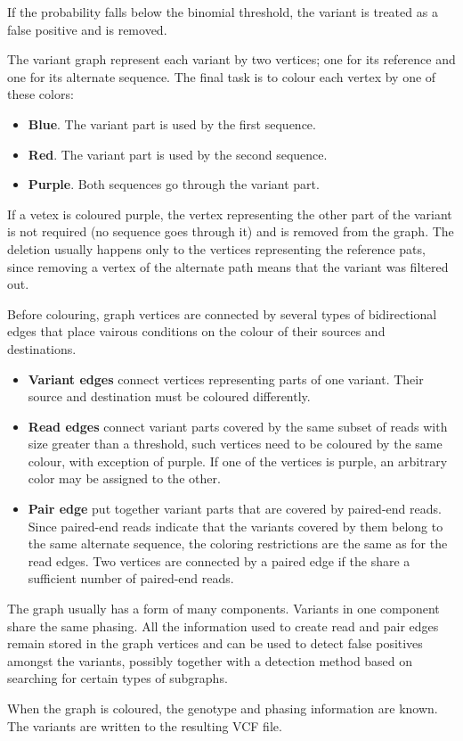 If the probability falls below the binomial threshold, the variant is treated as a false positive and is removed.

The variant graph represent each variant by two vertices; one for its reference and one for its alternate sequence. The final task is to colour each vertex by one of these colors:
\begin{itemize}
\item \textbf{Blue}. The variant part is used by the first sequence.
\item \textbf{Red}. The variant part is used by the second sequence.
\item \textbf{Purple}. Both sequences go through the variant part.
\end{itemize}

If a vetex is coloured purple, the vertex representing the other part of the variant is not required (no sequence goes through it) and is removed from the graph. The deletion usually happens only to the vertices representing the reference pats, since removing a vertex of the alternate path means that the variant was filtered out.

Before colouring, graph vertices are connected by several types of bidirectional edges that place vairous conditions on the colour of their sources and destinations.
\begin{itemize}
\item \textbf{Variant edges} connect vertices representing parts of one variant. Their source and destination must be coloured differently.
\item \textbf{Read edges} connect variant parts covered by the same subset of reads with size greater than a threshold, such vertices need to be coloured by the same colour, with exception of purple. If one of the vertices is purple, an arbitrary color may be assigned
to the other.
\item \textbf{Pair edge} put together variant parts that are covered by paired-end reads. Since paired-end reads indicate that the variants covered by them belong to the same alternate sequence, the coloring restrictions are the same as for the read edges. Two vertices are connected by a paired edge if the share a sufficient number of paired-end reads.
\end{itemize}

The graph usually has a form of many components. Variants in one component share the same phasing. All the information used to create read and pair edges remain stored in the graph vertices and can be used to detect false positives amongst the variants, possibly together with a detection method based on searching for certain types of subgraphs.

When the graph is coloured, the genotype and phasing information are known. The variants are written to the resulting VCF file.